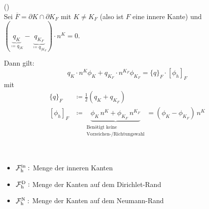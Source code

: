 \begin{Satz}()\\
	Sei $ \overline{F} = \partial K \cap \partial K_F $ mit $ K \ne K_F $ (also ist $ F $ eine innere Kante) und $ ( \underbrace{q_{K} }_{\coloneqq q_{|K}}- \underbrace{q_{K_F}}_{\coloneqq q_{|K_F}} )  \cdot n^K = 0$.
	
	Dann gilt:
	\[ q_K \cdot n^K \phi_K + q_{K_F} \cdot n^{K_F} \phi_{K_F} = \{q\}_F \cdot [\phi_h]_F \]
	mit
	\begin{align*}
		\{q\}_F &\coloneqq \frac{1}{2} (q_K + q_{K_F})\\
		[\phi_h]_F &\coloneqq \underbrace{\phi_K \, n^K + \phi_{K_F} \, n^{K_F}}_{\substack{\text{Benötigt keine}\\ \text{Vorzeichen-/Richtungswahl}}} = (\phi_K - \phi_{K_F}) \, n^K
	\end{align*}
\end{Satz}

\begin{notation}~
	\begin{itemize}
		\item $ \operatorname{\mathcal{F}_h^{\text{in}}}: $ Menge der inneren Kanten
		\item $ \operatorname{\mathcal{F}_h^{\text{D}}}: $ Menge der Kanten auf dem Dirichlet-Rand
		\item $ \operatorname{\mathcal{F}_h^{\text{N}}}: $ Menge der Kanten auf dem Neumann-Rand
	\end{itemize}
\end{notation}

